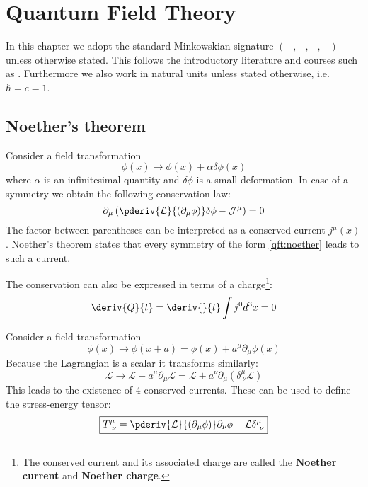 \chapter{Quantum Field Theory}

	In this chapter we adopt the standard Minkowskian signature $(+, -, -, -)$ unless otherwise stated. This follows the introductory literature and courses such as \cite{Peskin}. Furthermore we also work in natural units unless stated otherwise, i.e. $\hbar = c = 1$.
	
\section{Noether's theorem}

	\begin{theorem}\label{qft:noethers_theorem}
		Consider a field transformation
		\begin{equation}
			\label{qft:noether}
			\phi(x)\rightarrow \phi(x) + \alpha\delta\phi(x)
		\end{equation}
		where $\alpha$ is an infinitesimal quantity and $\delta\phi$ is a small deformation. In case of a symmetry we obtain the following conservation law:
		 \begin{equation}
		 	\label{qft:conserved_current}
		 	\partial_\mu\left(\pderiv{\mathcal{L}}{(\partial_\mu\phi)}\delta\phi - \mathcal{J}^\mu\right) = 0
		 \end{equation}
		 The factor between parentheses can be interpreted as a conserved current $j^\mu(x)$. Noether's theorem states that every symmetry of the form \ref{qft:noether} leads to such a current.
		 
		 The conservation can also be expressed in terms of a charge\footnote{The conserved current and its associated charge are called the \textbf{Noether current} and \textbf{Noether charge}.}:
		 \begin{equation}
		 	\deriv{Q}{t} = \deriv{}{t}\int j^0d^3x = 0
		 \end{equation}
	\end{theorem}

	\begin{definition}
		Consider a field transformation
		\[
			\phi(x)\rightarrow\phi(x+a) = \phi(x) + a^\mu\partial_\mu\phi(x)
		\]
		Because the Lagrangian is a scalar it transforms similarly:
		\begin{equation}
			\mathcal{L}\rightarrow\mathcal{L} + a^\mu\partial_\mu\mathcal{L} = \mathcal{L} + a^\nu\partial_\mu(\delta^\mu_{\ \nu}\mathcal{L})
		\end{equation}
		This leads to the existence of 4 conserved currents. These can be used to define the stress-energy tensor:
		\begin{equation}
			\boxed{T^\mu_{\ \nu} = \pderiv{\mathcal{L}}{(\partial_\mu\phi)}\partial_\nu\phi - \mathcal{L}\delta^\mu_{\ \nu}}
		\end{equation}
	\end{definition}

